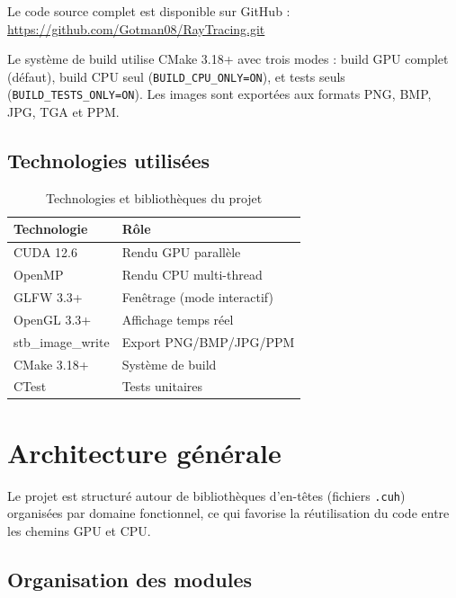 \documentclass[12pt,a4paper]{article}
\begin{document}
Le code source complet est disponible sur GitHub :
\url{https://github.com/Gotman08/RayTracing.git}

Le système de build utilise CMake 3.18+ avec trois modes : build GPU complet (défaut),
build CPU seul (\texttt{BUILD\_CPU\_ONLY=ON}), et tests seuls (\texttt{BUILD\_TESTS\_ONLY=ON}).
Les images sont exportées aux formats PNG, BMP, JPG, TGA et PPM.

\subsection{Technologies utilisées}

\begin{table}[H]
\centering
\begin{tabular}{ll}
\toprule
\textbf{Technologie} & \textbf{Rôle} \\
\midrule
CUDA 12.6           & Rendu GPU parallèle \\
OpenMP              & Rendu CPU multi-thread \\
GLFW 3.3+           & Fenêtrage (mode interactif) \\
OpenGL 3.3+         & Affichage temps réel \\
stb\_image\_write   & Export PNG/BMP/JPG/PPM \\
CMake 3.18+         & Système de build \\
CTest               & Tests unitaires \\
\bottomrule
\end{tabular}
\caption{Technologies et bibliothèques du projet}
\end{table}

\section{Architecture générale}

Le projet est structuré autour de bibliothèques d'en-têtes (fichiers \texttt{.cuh}) organisées
par domaine fonctionnel, ce qui favorise la réutilisation du code entre les chemins GPU et CPU.

\subsection{Organisation des modules}
\end{document}
